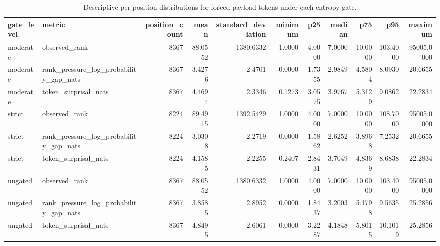 \begin{table}
\caption{Descriptive per-position distributions for forced payload tokens under each entropy gate.}
\label{tab:entropy-gate-forced-token-distribution}
\begin{tabular}{llrrrrrrrrr}
\toprule
gate\_level & metric & position\_count & mean & standard\_deviation & minimum & p25 & median & p75 & p95 & maximum \\
\midrule
moderate & observed\_rank & 8367 & 88.0552 & 1380.6332 & 1.0000 & 4.0000 & 7.0000 & 10.0000 & 103.4000 & 95005.0000 \\
moderate & rank\_pressure\_log\_probability\_gap\_nats & 8367 & 3.4276 & 2.4701 & 0.0000 & 1.7355 & 2.9849 & 4.5804 & 8.0930 & 20.6655 \\
moderate & token\_surprisal\_nats & 8367 & 4.4694 & 2.3346 & 0.1273 & 3.0575 & 3.9767 & 5.3129 & 9.0862 & 22.2834 \\
strict & observed\_rank & 8224 & 89.4915 & 1392.5429 & 1.0000 & 4.0000 & 7.0000 & 10.0000 & 108.7000 & 95005.0000 \\
strict & rank\_pressure\_log\_probability\_gap\_nats & 8224 & 3.0308 & 2.2719 & 0.0000 & 1.5862 & 2.6252 & 3.8968 & 7.2532 & 20.6655 \\
strict & token\_surprisal\_nats & 8224 & 4.1585 & 2.2255 & 0.2407 & 2.8431 & 3.7049 & 4.8369 & 8.6838 & 22.2834 \\
ungated & observed\_rank & 8367 & 88.0552 & 1380.6332 & 1.0000 & 4.0000 & 7.0000 & 10.0000 & 103.4000 & 95005.0000 \\
ungated & rank\_pressure\_log\_probability\_gap\_nats & 8367 & 3.8585 & 2.8952 & 0.0000 & 1.8437 & 3.2003 & 5.1798 & 9.5635 & 25.2856 \\
ungated & token\_surprisal\_nats & 8367 & 4.8495 & 2.6061 & 0.0000 & 3.2287 & 4.1848 & 5.8015 & 10.1019 & 25.2856 \\
\bottomrule
\end{tabular}
\end{table}
